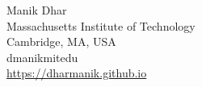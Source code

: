\documentclass{aic}
\begin{document}
\begin{aicauthors}
\begin{authorinfo}[pgom]
  Manik Dhar\\
  Massachusetts Institute of Technology\\
  
  Cambridge, MA, USA\\
  dmanik\imageat{}mit\imagedot{}edu \\
  \url{https://dharmanik.github.io}
\end{authorinfo}
\end{aicauthors}
\end{document}
